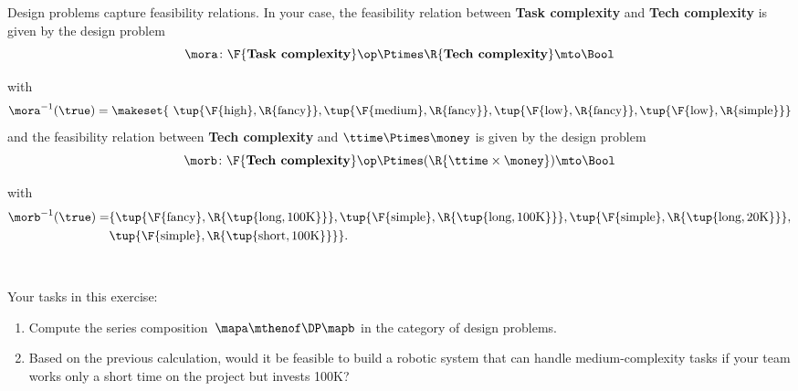 \begin{gradedexercise}
    Design problems capture feasibility relations.
    In your case, the feasibility relation between \textbf{Task complexity} and \textbf{Tech complexity} is given by the design problem
    \begin{equation}
        \mora\colon \F{\textbf{Task complexity}}\op \Ptimes \R{\textbf{Tech complexity}} \mto \Bool
    \end{equation}
    \begin{center}
    \end{center}
    with
    \begin{equation*}
        \mora^{-1}(\true) = \makeset{ \ \tup{\F{\text{high} }, \R{ \text{fancy} }}, \tup{\F{\text{medium} }, \R{ \text{fancy} }}, \tup{\F{\text{low} }, \R{ \text{fancy} }}, \tup{\F{\text{low} }, \R{ \text{simple} }}}
    \end{equation*}
    and the feasibility relation between \textbf{Tech complexity} and $\ttime \Ptimes \money$ is given by the design problem
    \begin{equation}
        \morb \colon \F{\textbf{Tech complexity}}\op \Ptimes (\R{\ttime \times \money}) \mto \Bool
    \end{equation}
    \begin{center}
    \end{center}
    with
    \begin{align*}
        \morb^{-1}(\true) = & \{ \tup{\F{\text{fancy} }, \R{ \tup{\text{long}, \text{100K}} }}, \tup{\F{\text{simple} }, \R{ \tup{\text{long}, \text{100K}} }}, \tup{\F{\text{simple} }, \R{ \tup{\text{long}, \text{20K}} }}, \\
                            & \tup{\F{\text{simple} }, \R{ \tup{\text{short}, \text{100K}} }} \}.
    \end{align*}

    \

    Your tasks in this exercise:
    \begin{enumerate}
        \item Compute the series composition~$\mapa \mthenof\DP \mapb$ in the category of design problems.
        \item Based on the previous calculation, would it be feasible to build a robotic system that can handle medium-complexity tasks if your team works only a short time on the project but invests 100K?
    \end{enumerate}
\end{gradedexercise}

